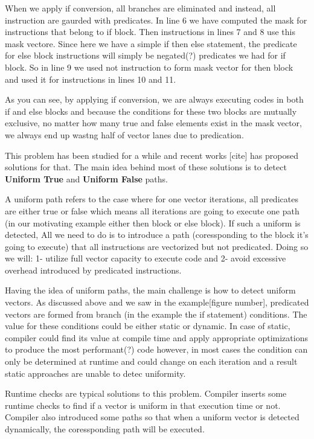 \documentclass[\main/thesis.tex]{subfiles}
\begin{document}
When we apply if conversion, all branches are eliminated and instead, all instruction are gaurded with predicates. In line 6 we have computed the mask for instructions that belong to if block. Then instructions in lines 7 and 8 use this mask vectore. Since here we have a simple if then else statement,
the predicate for else block instructions will simply be negated(?) predicates we had for if block. So in line 9 we used not instruction to form mask vector for then block and used it for instructions in lines 10 and 11.

As you can see, by applying if conversion, we are always executing codes in both if and else blocks and because the conditions for these two blocks are mutually exclusive, no matter how many true and false elements exist in 
the mask vector, we always end up wastng half of vector lanes due to predication.

This problem has been studied for a while and recent works [cite] has proposed solutions for that. The main idea behind most of these solutions is to detect \textbf{Uniform True} and \textbf{Uniform False} paths.

A uniform path refers to the case where for one vector iterations, all predicates are either true or false which means all iterations are going to execute one path (in our motivating example either then block or else block). If such a uniform is detected, All we need to 
do is to introduce a path (coressponding to the block it's going to execute) that all instructions are vectorized but not predicated. Doing so we will: 1- utilize full vector capacity to execute code and 2- avoid excessive overhead introduced by predicated 
instructions.

Having the idea of uniform paths, the main challenge is how to detect uniform vectors. As discussed above and we saw in the example[figure number], predicated vectors are formed from branch (in the example the if statement) conditions. The value for these conditions could be 
either static or dynamic. In case of static, compiler could find its value at compile time and apply appropriate optimizations to produce the most performant(?) code however, in most cases the condition can only be determined at runtime and could change on each iteration and 
a result static approaches are unable to detec uniformity. 

Runtime checks are typical solutions to this problem. Compiler inserts some runtime checks to find if a vector is uniform in that execution time or not. Compiler also introduced some paths so that when a uniform vector is detected dynamically, the coressponding path will be executed.
\end{document}
